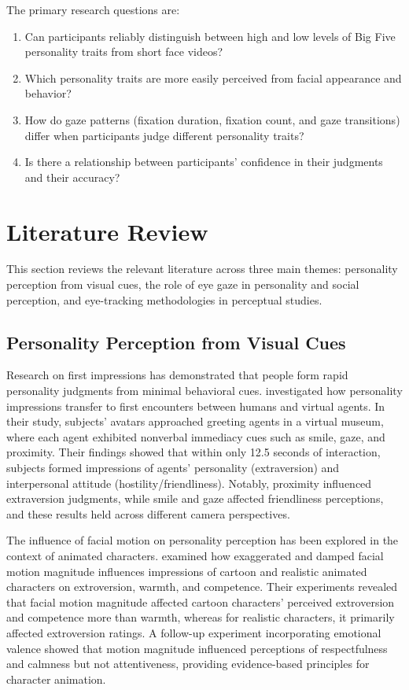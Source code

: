 \documentclass[12pt,a4paper]{article}
\begin{document}
The primary research questions are:
\begin{enumerate}
    \item Can participants reliably distinguish between high and low levels of Big Five personality traits from short face videos?
    \item Which personality traits are more easily perceived from facial appearance and behavior?
    \item How do gaze patterns (fixation duration, fixation count, and gaze transitions) differ when participants judge different personality traits?
    \item Is there a relationship between participants' confidence in their judgments and their accuracy?
\end{enumerate}

\section{Literature Review}

This section reviews the relevant literature across three main themes: personality perception from visual cues, the role of eye gaze in personality and social perception, and eye-tracking methodologies in perceptual studies.

\subsection{Personality Perception from Visual Cues}

Research on first impressions has demonstrated that people form rapid personality judgments from minimal behavioral cues. \citet{cafaro2014first} investigated how personality impressions transfer to first encounters between humans and virtual agents. In their study, subjects' avatars approached greeting agents in a virtual museum, where each agent exhibited nonverbal immediacy cues such as smile, gaze, and proximity. Their findings showed that within only 12.5 seconds of interaction, subjects formed impressions of agents' personality (extraversion) and interpersonal attitude (hostility/friendliness). Notably, proximity influenced extraversion judgments, while smile and gaze affected friendliness perceptions, and these results held across different camera perspectives.

The influence of facial motion on personality perception has been explored in the context of animated characters. \citet{hyde2016evaluating} examined how exaggerated and damped facial motion magnitude influences impressions of cartoon and realistic animated characters on extroversion, warmth, and competence. Their experiments revealed that facial motion magnitude affected cartoon characters' perceived extroversion and competence more than warmth, whereas for realistic characters, it primarily affected extroversion ratings. A follow-up experiment incorporating emotional valence showed that motion magnitude influenced perceptions of respectfulness and calmness but not attentiveness, providing evidence-based principles for character animation.
\end{document}
